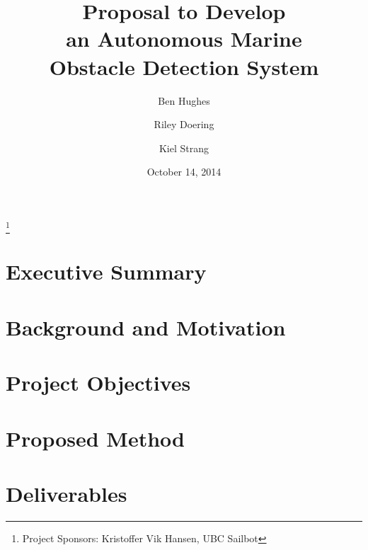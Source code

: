 \documentclass[amsmath, amssymb, pra, aps, 12pt]{revtex4-1}
\begin{document}
\title{Proposal to Develop\\an Autonomous Marine\\Obstacle Detection System}
\author{Ben Hughes}
\thanks{Project Sponsors: Kristoffer Vik Hansen, UBC Sailbot}
\author{Riley Doering}
\author{Kiel Strang}
\date{October 14, 2014}
\maketitle


\section*{Executive Summary}


\newpage
\tableofcontents

\makeatletter
\let\toc@pre\relax
\let\toc@post\relax
\makeatother 

\newpage
\listoffigures
\listoftables

\clearpage
\newpage
{}

\section{\label{sec:intro}Background and Motivation}


\section{\label{sec:objectives}Project Objectives}


\section{\label{sec:method}Proposed Method}


\section{\label{sec:deliverables}Deliverables}

\end{document}
